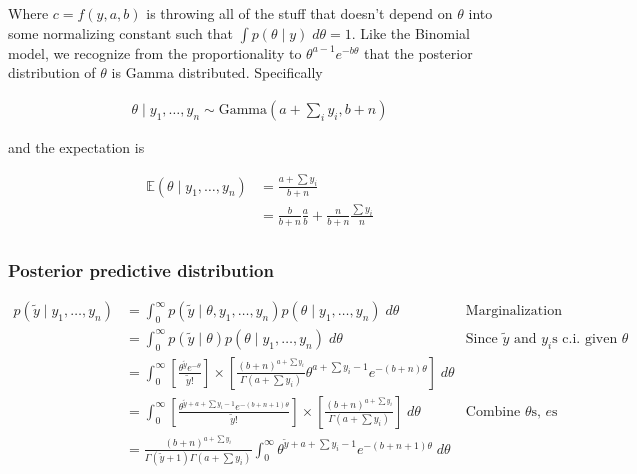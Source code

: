 \documentclass[]{article}
\begin{document}
Where \(c = f(y, a, b)\) is throwing all of the stuff that doesn't
depend on \(\theta\) into some normalizing constant such that
\(\int p(\theta \mid y) \; d\theta = 1\). Like the Binomial model, we
recognize from the proportionality to \(\theta^{a - 1} e^{-b \theta}\)
that the posterior distribution of \(\theta\) is Gamma distributed.
Specifically

\begin{align}
\theta \mid y_1, \dots, y_n \sim \text{Gamma}(a + \sum_i y_i, b + n)
\end{align}

and the expectation is

\begin{align}
\mathbb{E}(\theta \mid y_1, \dots, y_n) &= \frac{a + \sum y_i}{b + n} \\
&= \frac{b}{b + n} \frac{a}{b} + \frac{n}{b + n}\frac{\sum y_i}{n} \\
\end{align}

\hypertarget{posterior-predictive-distribution}{%
\subsubsection{Posterior predictive
distribution}\label{posterior-predictive-distribution}}

\begin{align}
p(\tilde{y} \mid y_1, \dots, y_n) &= \int_0^{\infty} p(\tilde{y} \mid \theta, y_1, \dots, y_n) p(\theta \mid y_1, \dots, y_n) \; d\theta & \text{Marginalization} \\
&= \int_0^{\infty} p(\tilde{y} \mid \theta) p(\theta \mid y_1, \dots, y_n) \; d\theta & \text{Since $\tilde{y}$ and $y_i$s c.i. given $\theta$} \\
&= \int_0^{\infty} \left[ \frac{\theta^{\tilde{y}} e^{-\theta}}{\tilde{y}!} \right] \times \left[ \frac{(b + n)^{a + \sum y_i}}{\Gamma(a + \sum y_i)} \theta^{a + \sum y_i - 1} e^{-(b + n)\theta} \right] \; d\theta \\
&= \int_0^{\infty} \left[ \frac{\theta^{\tilde{y} + a + \sum y_i - 1} e^{-(b + n + 1)\theta}}{\tilde{y}!} \right] \times \left[ \frac{(b + n)^{a + \sum y_i}}{\Gamma(a + \sum y_i)} \right] \; d\theta & \text{Combine $\theta$s, $e$s} \\
&= \frac{(b + n)^{a + \sum y_i}}{\Gamma(\tilde{y} + 1) \Gamma(a + \sum y_i)} \int_0^{\infty} \theta^{\tilde{y} + a + \sum y_i - 1} e^{-(b + n + 1)\theta} \; d\theta \\
\end{align}
\end{document}
